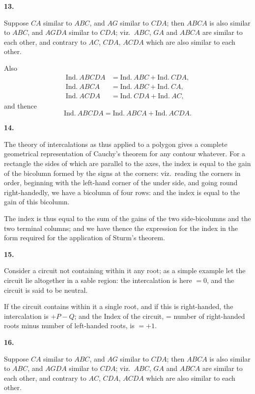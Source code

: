 \documentclass[12pt,a4paper]{article}
\theoremstyle{plain}
\theoremstyle{definition}
\begin{document}
\textbf{13.}

Suppose $CA$ similar to $ABC$, and $AG$ similar to $CDA$; then $ABCA$ is also similar to $ABC$, and $AGDA$ similar to $CDA$; viz.\ $ABC$, $GA$ and $ABCA$ are similar to each other, and contrary to $AC$, $CDA$, $ACDA$ which are also similar to each other.

Also
\begin{align*}
\text{Ind.}\ ABCDA &= \text{Ind.}\ ABC + \text{Ind.}\ CDA,\\
\text{Ind.}\ ABCA &= \text{Ind.}\ ABC + \text{Ind.}\ CA,\\
\text{Ind.}\ ACDA &= \text{Ind.}\ CDA + \text{Ind.}\ AC,
\end{align*}
and thence
\[
\text{Ind.}\ ABCDA = \text{Ind.}\ ABCA + \text{Ind.}\ ACDA.
\]

\newpage
\setcounter{page}{26}

\textbf{14.}

The theory of intercalations as thus applied to a polygon gives a complete geometrical representation of Cauchy's theorem for any contour whatever. For a rectangle the sides of which are parallel to the axes, the index is equal to the gain of the bicolumn formed by the signs at the corners: viz.\ reading the corners in order, beginning with the left-hand corner of the under side, and going round right-handedly, we have a bicolumn of four rows: and the index is equal to the gain of this bicolumn.

The index is thus equal to the sum of the gains of the two side-bicolumns and the two terminal columns; and we have thence the expression for the index in the form required for the application of Sturm's theorem.

\textbf{15.}

Consider a circuit not containing within it any root; as a simple example let the circuit lie altogether in a sable region: the intercalation is here $= 0$, and the circuit is said to be neutral.

If the circuit contains within it a single root, and if this is right-handed, the intercalation is $+P - Q$; and the Index of the circuit, = number of right-handed roots minus number of left-handed roots, is $= +1$.

\newpage
\setcounter{page}{27}

\textbf{16.}

Suppose $CA$ similar to $ABC$, and $AG$ similar to $CDA$; then $ABCA$ is also similar to $ABC$, and $AGDA$ similar to $CDA$; viz.\ $ABC$, $GA$ and $ABCA$ are similar to each other, and contrary to $AC$, $CDA$, $ACDA$ which are also similar to each other.
\end{document}

